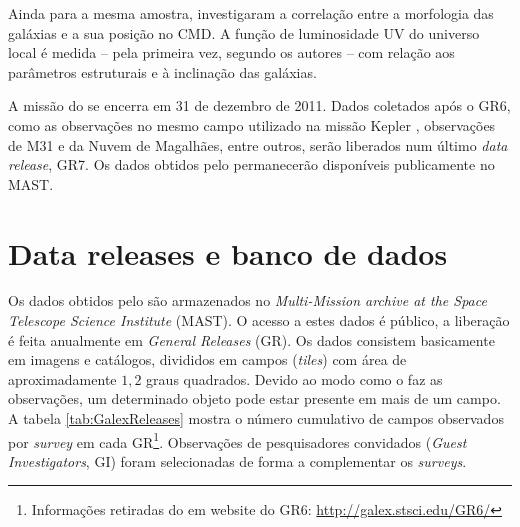 Ainda para a mesma amostra, \citet{Schiminovich2007} investigaram a correlação
entre a morfologia das galáxias e a sua posição no CMD. A função de luminosidade
UV do universo local é medida -- pela primeira vez, segundo os autores -- com
relação aos parâmetros estruturais e à inclinação das galáxias.

A missão do \galex se encerra em 31 de dezembro de 2011. Dados coletados após o
GR6, como as observações no mesmo campo utilizado na missão Kepler
\citep{KeplerMission}, observações de M31 e da Nuvem de Magalhães, entre outros,
serão liberados num último {\em data release}, GR7. Os dados obtidos pelo \galex
permanecerão disponíveis publicamente no MAST.




\section{Data releases e banco de dados}
\label{sec:Galex:BancoDeDados}

Os dados obtidos pelo \galex são armazenados no {\em Multi-Mission archive at
the Space Telescope Science Institute} (MAST). O acesso a estes dados é público,
a liberação é feita anualmente em {\em General Releases} (GR). Os dados
consistem basicamente em imagens e catálogos, divididos em campos ({\em tiles})
com área de aproximadamente $1,2$ graus quadrados. Devido ao modo como o \galex
faz as observações, um determinado objeto pode estar presente em mais de um
campo. A tabela \ref{tab:GalexReleases} mostra o número cumulativo de campos
observados por {\em survey} em cada GR\footnote{Informações retiradas do {em
website} do GR6: \url{http://galex.stsci.edu/GR6/}}. Observações de
pesquisadores convidados ({\em Guest Investigators}, GI) foram selecionadas de
forma a complementar os {\em surveys}.

